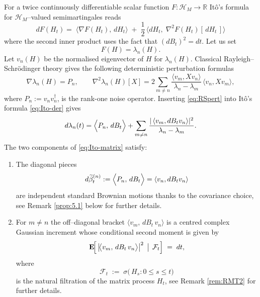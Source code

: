 \documentclass[12pt,reqno]{amsart}
\theoremstyle{plain}
\theoremstyle{definition}
\theoremstyle{remark}
\begin{document}
For a twice continuously differentiable scalar function $F: \mathcal{H}_M \rightarrow \mathbb{R} $ Itô’s formula for \(\mathcal H_M\)–valued semimartingales reads
\begin{equation}
\label{eq:Ito-der}
  dF(H_t)
    =\;\bigl\langle\nabla F(H_t),\,dH_t\bigr\rangle
     \;+\;
     \frac{1}{2}\,
     \bigl\langle dH_t,\;\nabla^{2}F(H_t)[\,dH_t\,]\bigr\rangle
\end{equation}
where the second inner product uses the fact that
\((dB_t)^2=dt\). Let us set 
\begin{equation} F(H)=\lambda_n(H). 
\end{equation} 
Let \(v_n(H)\) be the normalised eigenvector of \(H\) for \(\lambda_n(H)\).
Classical Rayleigh–Schrödinger theory gives the following deterministic perturbation formulas
\begin{equation}
\label{eq:RSpert}
\nabla\lambda_n(H)=P_n,
\qquad
\nabla^{2}\lambda_n(H)[X]
 =2\!\sum_{m\neq n}
   \frac{\langle v_m,X v_n\rangle}{\lambda_n-\lambda_m}\,
   \langle v_n,X v_m\rangle ,
\end{equation}
where 
\(P_n:=v_n v_n^{\!\dagger}\), is the rank-one noise operator. 
Inserting \eqref{eq:RSpert} into
Itô's formula \eqref{eq:Ito-der} gives
\begin{equation}
\label{eq:Ito-matrix}
d\lambda_n(t)
=\Bigl\langle P_n,\,dB_t\Bigr\rangle
   +
   \sum_{m\neq n}
     \frac{|\,\langle v_m,dB_t v_n\rangle|^{2}}
          {\lambda_n-\lambda_m}.
\end{equation}
The two components of \eqref{eq:Ito-matrix} satisfy: 
\begin{enumerate}
\item The diagonal pieces
\begin{equation}
\label{eq:BnRMT}
d\widetilde{\beta}^{(n)}_t:=\Bigl\langle P_n, \,dB_t\Bigr\rangle =\langle v_n,dB_tv_n\rangle
\end{equation}
are independent standard Brownian motions thanks to the covariance
choice, see Remark \ref{prop:5.1} below for further details. 
\item  For $m\neq n$ the off–diagonal bracket
      \(
        \big\langle v_m,\,dB_t\,v_n\big\rangle
      \)
      is a centred complex Gaussian increment whose conditional second moment is given by 
      \begin{equation}
        \mathbf E\!\Bigl[\,
          \bigl|\!\bigl\langle v_m,\,dB_t\,v_n\bigr\rangle\bigr|^{2}
          \,\bigm|\,\mathcal F_t
        \Bigr]
        \;=\;dt,
      \end{equation}
      where 
      \begin{equation}
\mathcal{F}_t
\;:=\;
\sigma\!\bigl(\,H_s : 0\le s\le t\bigr)
\end{equation}
is the natural filtration of the matrix process $H_t$, see Remark \ref{rem:RMT2} for further details. 
\end{enumerate}
\end{document}
